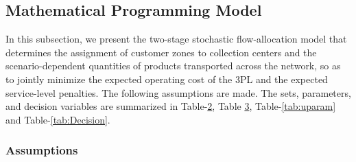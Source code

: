 \documentclass[11pt, a4paper]{article}
\begin{document}
\subsection{Mathematical Programming Model}\label{mathematical-programming-model}
In this subsection, we present the two-stage stochastic flow-allocation model that determines the assignment of customer zones to collection centers and the scenario-dependent quantities of products transported across the network, so as to jointly minimize the expected operating cost of the 3PL and the expected service-level penalties. The following assumptions are made. The sets, parameters, and decision variables are summarized in Table-\protect\hyperlink{t1}{2}, Table \protect\hyperlink{t2}{3}, Table-\ref{tab:uparam} and Table-\ref{tab:Decision}.

\subsubsection*{Assumptions}\label{assumptions}
\end{document}
